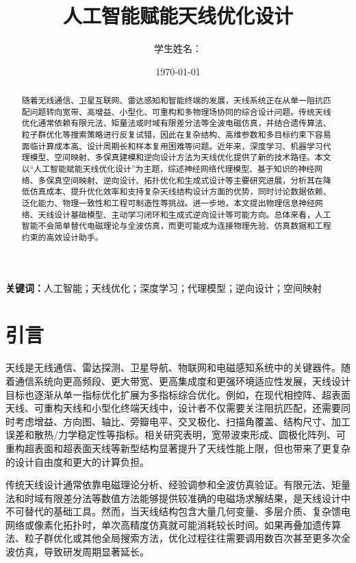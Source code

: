 \documentclass[UTF8,a4paper,12pt]{ctexart}
\title{\textbf{人工智能赋能天线优化设计}}
\author{学生姓名：\underline{\hspace{4cm}}}
\date{\today}
\begin{document}
\maketitle

\begin{abstract}
随着无线通信、卫星互联网、雷达感知和智能终端的发展，天线系统正在从单一阻抗匹配问题转向宽带、高增益、小型化、可重构和多物理场协同的综合设计问题。传统天线优化通常依赖有限元法、矩量法或时域有限差分法等全波电磁仿真，并结合遗传算法、粒子群优化等搜索策略进行反复试错，因此在复杂结构、高维参数和多目标约束下容易面临计算成本高、设计周期长和样本复用困难等问题。近年来，深度学习、机器学习代理模型、空间映射、多保真建模和逆向设计方法为天线优化提供了新的技术路径。本文以“人工智能赋能天线优化设计”为主题，综述神经网络代理模型、基于知识的神经网络、多保真空间映射、逆向设计、拓扑优化和生成式设计等主要研究进展，分析其在降低仿真成本、提升优化效率和支持复杂天线结构设计方面的优势，同时讨论数据依赖、泛化能力、物理一致性和工程可制造性等挑战。进一步地，本文提出物理信息神经网络、天线设计基础模型、主动学习闭环和生成式逆向设计等可能方向。总体来看，人工智能不会简单替代电磁理论与全波仿真，而更可能成为连接物理先验、仿真数据和工程约束的高效设计助手。
\end{abstract}

\noindent\textbf{关键词：}人工智能；天线优化；深度学习；代理模型；逆向设计；空间映射

\section{引言}

天线是无线通信、雷达探测、卫星导航、物联网和电磁感知系统中的关键器件。随着通信系统向更高频段、更大带宽、更高集成度和更强环境适应性发展，天线设计目标也逐渐从单一指标优化扩展为多指标综合优化。例如，在现代相控阵、超表面天线、可重构天线和小型化终端天线中，设计者不仅需要关注阻抗匹配，还需要同时考虑增益、方向图、轴比、旁瓣电平、交叉极化、扫描角覆盖、结构尺寸、加工误差和散热/力学稳定性等指标。相关研究表明，宽带波束形成、圆极化阵列、可重构超表面和超表面天线等新型结构显著提升了天线性能上限，但也带来了更复杂的设计自由度和更大的计算负担\cite{liu2024cawe,xue2024broadband,marzetta2010noncooperative,sievenpiper2012limits,li2023chiral,li2024reconfigurable,wang2020metantenna,venkateshwaran2022ebg}。

传统天线设计通常依靠电磁理论分析、经验调参和全波仿真验证。有限元法、矩量法和时域有限差分法等数值方法能够提供较准确的电磁场求解结果，是天线设计中不可替代的基础工具\cite{alhaj2023mom,david2023fdtd}。然而，当天线结构包含大量几何变量、多层介质、复杂馈电网络或像素化拓扑时，单次高精度仿真就可能消耗较长时间。如果再叠加遗传算法、粒子群优化或其他全局搜索方法，优化过程往往需要调用数百次甚至更多次全波仿真，导致研发周期显著延长\cite{rahmat2003pso,el2020review}。
\end{document}
